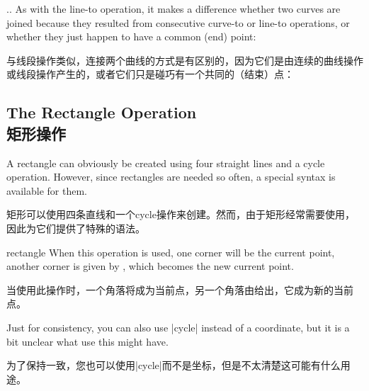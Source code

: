 \begin{pathoperation}{..}{}
    As with the line-to operation, it makes a difference whether two curves are
    joined because they resulted from consecutive curve-to or line-to
    operations, or whether they just happen to have a common (end) point:

    与线段操作类似，连接两个曲线的方式是有区别的，因为它们是由连续的曲线操作或线段操作产生的，或者它们只是碰巧有一个共同的（结束）点：

\begin{codeexample}[]
\end{codeexample}
\end{pathoperation}


\subsection{The Rectangle Operation\\矩形操作}

A rectangle can obviously be created using four straight lines and a cycle
operation. However, since rectangles are needed so often, a special syntax is
available for them.

矩形可以使用四条直线和一个cycle操作来创建。然而，由于矩形经常需要使用，因此为它们提供了特殊的语法。

\begin{pathoperation}{rectangle}{}
    When this operation is used, one corner will be the current point, another
    corner is given by , which becomes the new current point.
    
    当使用此操作时，一个角落将成为当前点，另一个角落由给出，它成为新的当前点。

\begin{codeexample}[]
\end{codeexample}

    Just for consistency, you can also use |cycle| instead of a coordinate, but
    it is a bit unclear what use this might have.

    为了保持一致，您也可以使用|cycle|而不是坐标，但是不太清楚这可能有什么用途。
\end{pathoperation}


